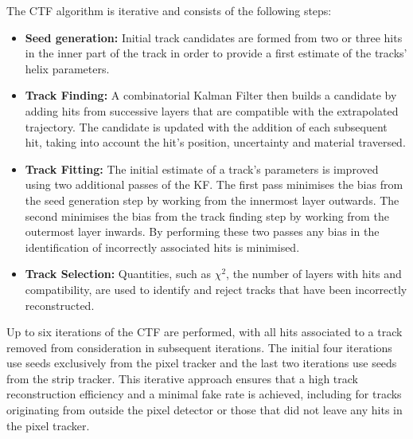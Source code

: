 The CTF algorithm is iterative and consists of the following steps:
\begin{itemize}
\item \textbf{Seed generation:} Initial track candidates are formed from two or three hits in the inner part of the track in order to provide a first estimate of the tracks' helix parameters.
\item \textbf{Track Finding:} A combinatorial Kalman Filter then builds a candidate by adding hits from successive layers that are compatible with the extrapolated trajectory. The candidate is updated with the addition of each subsequent hit, taking into account the hit's position, uncertainty and material traversed.
\item \textbf{Track Fitting:} The initial estimate of a track's parameters is improved using two additional passes of the KF.
The first pass minimises the bias from the seed generation step by working from the innermost layer outwards.
The second minimises the bias from the track finding step by working from the outermost layer inwards.
By performing these two passes any bias in the identification of incorrectly associated hits is minimised.
\item \textbf{Track Selection:} Quantities, such as $\chi^{2}$, the number of layers with hits and compatibility, are used to identify and reject tracks that have been incorrectly reconstructed.
\end{itemize}

Up to six iterations of the CTF are performed, with all hits associated to a track removed from consideration in subsequent iterations.
The initial four iterations use seeds exclusively from the pixel tracker and the last two iterations use seeds from the strip tracker.
This iterative approach ensures that a high track reconstruction efficiency and a minimal fake rate is achieved, including for tracks originating from outside the pixel detector or those that did not leave any hits in the pixel tracker.

